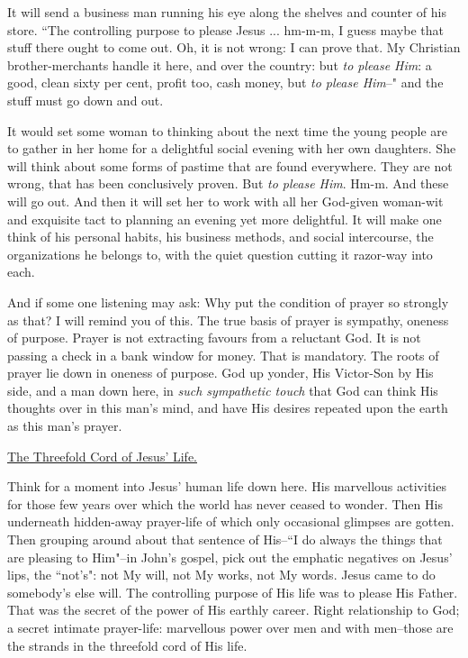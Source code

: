 It will send a business man running his eye along the shelves and counter
of his store. ``The controlling purpose to please Jesus ... hm-m-m, I guess
maybe that stuff there ought to come out. Oh, it is not wrong: I can prove
that. My Christian brother-merchants handle it here, and over the country:
but \textit{to please Him}: a good, clean sixty per cent, profit too, cash money,
but \textit{to please Him}--" and the stuff must go down and out.

It would set some woman to thinking about the next time the young people
are to gather in her home for a delightful social evening with her own
daughters. She will think about some forms of pastime that are found
everywhere. They are not wrong, that has been conclusively proven. But \textit{to
please Him}. Hm-m. And these will go out. And then it will set her to
work with all her God-given woman-wit and exquisite tact to planning an
evening yet more delightful. It will make one think of his personal
habits, his business methods, and social intercourse, the organizations he
belongs to, with the quiet question cutting it razor-way into each.

And if some one listening may ask: Why put the condition of prayer so
strongly as that? I will remind you of this. The true basis of prayer is
sympathy, oneness of purpose. Prayer is not extracting favours from a
reluctant God. It is not passing a check in a bank window for money. That
is mandatory. The roots of prayer lie down in oneness of purpose. God up
yonder, His Victor-Son by His side, and a man down here, in \textit{such
sympathetic touch} that God can think His thoughts over in this man's
mind, and have His desires repeated upon the earth as this man's prayer.



\underline{The Threefold Cord of Jesus' Life.}


Think for a moment into Jesus' human life down here. His marvellous
activities for those few years over which the world has never ceased to
wonder. Then His underneath hidden-away prayer-life of which only
occasional glimpses are gotten. Then grouping around about that sentence
of His--``I do always the things that are pleasing to Him"--in John's
gospel, pick out the emphatic negatives on Jesus' lips, the ``not's": not
My will, not My works, not My words. Jesus came to do somebody's else
will. The controlling purpose of His life was to please His Father. That
was the secret of the power of His earthly career. Right relationship to
God; a secret intimate prayer-life: marvellous power over men and with
men--those are the strands in the threefold cord of His life.

